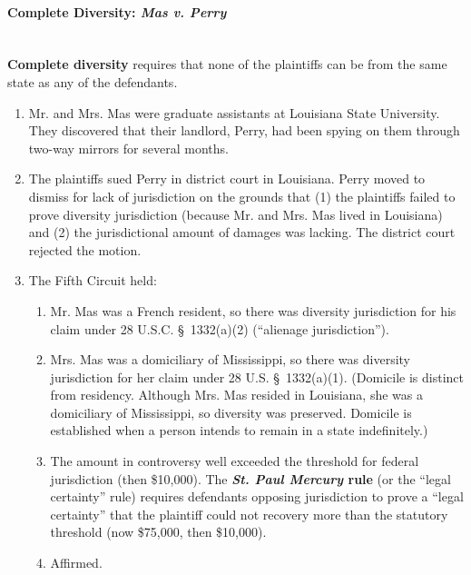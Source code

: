 \paragraph{Complete Diversity: \emph{Mas v. Perry}\\\\}

\textbf{Complete diversity} requires that none of the plaintiffs can be from 
the same state as any of the defendants.

\begin{enumerate}
    \item Mr. and Mrs. Mas were graduate assistants at Louisiana State 
    University. They discovered that their landlord, Perry, had been spying on 
    them through two-way mirrors for several months.
    \item The plaintiffs sued Perry in district court in Louisiana. Perry 
    moved to dismiss for lack of jurisdiction on the grounds that (1) the 
    plaintiffs failed to prove diversity jurisdiction (because Mr. and Mrs.  
    Mas lived in Louisiana) and (2) the jurisdictional amount of damages was 
    lacking. The district court rejected the motion.
    \item The Fifth Circuit held:
    \begin{enumerate}
        \item Mr. Mas was a French resident, so there was diversity 
        jurisdiction for his claim under 28 U.S.C. \S\ 1332(a)(2) (``alienage 
        jurisdiction'').
        \item Mrs. Mas was a domiciliary of Mississippi, so there was 
        diversity jurisdiction for her claim under 28 U.S. \S\ 1332(a)(1). 
        (Domicile is distinct from residency. Although Mrs. Mas resided in 
        Louisiana, she was a domiciliary of Mississippi, so diversity was 
        preserved. Domicile is established when a person intends to remain in 
        a state indefinitely.)
        \item The amount in controversy well exceeded the threshold for 
        federal jurisdiction (then \$10,000). The \textbf{\emph{St. Paul 
        Mercury} rule} (or the ``legal certainty'' rule) requires defendants 
        opposing jurisdiction to prove a ``legal certainty'' that the 
        plaintiff could not recovery more than the statutory threshold (now 
        \$75,000, then \$10,000).
        \item Affirmed.
    \end{enumerate}
\end{enumerate}


